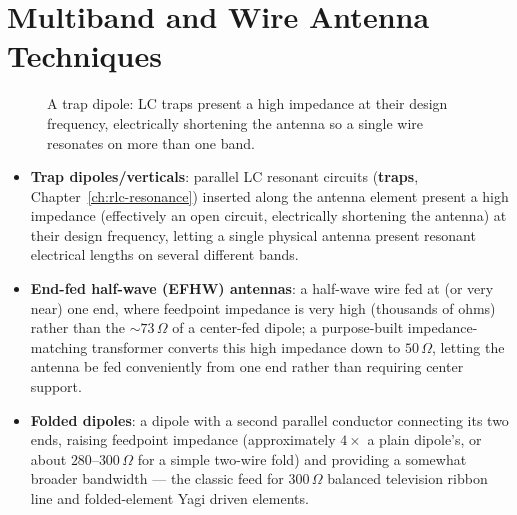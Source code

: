 \section{Multiband and Wire Antenna Techniques}

\begin{figure}[H]
\centering
{}
\caption{A trap dipole: LC traps present a high impedance at their
design frequency, electrically shortening the antenna so a single wire
resonates on more than one band.}
\end{figure}

\begin{itemize}
\item \textbf{Trap dipoles/verticals}: parallel LC resonant circuits
(\textbf{traps}, Chapter~\ref{ch:rlc-resonance}) inserted along the
antenna element present a high impedance (effectively an open circuit,
electrically shortening the antenna) at their design frequency, letting
a single physical antenna present resonant electrical lengths on
several different bands.
\item \textbf{End-fed half-wave (EFHW) antennas}: a half-wave wire fed
at (or very near) one end, where feedpoint impedance is very high
(thousands of ohms) rather than the ${\sim}73\,\Omega$ of a center-fed
dipole; a purpose-built impedance-matching transformer converts this
high impedance down to $50\,\Omega$, letting the antenna be fed
conveniently from one end rather than requiring center support.
\item \textbf{Folded dipoles}: a dipole with a second parallel
conductor connecting its two ends, raising feedpoint impedance
(approximately $4\times$ a plain dipole's, or about $280$--$300\,\Omega$
for a simple two-wire fold) and providing a somewhat broader bandwidth
--- the classic feed for 300\,$\Omega$ balanced television ribbon line
and folded-element Yagi driven elements.
\end{itemize}

